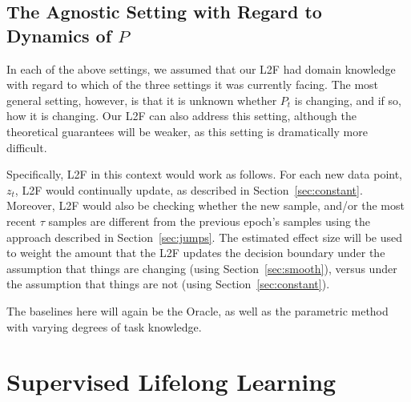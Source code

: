 \documentclass{article}
\begin{document}
\subsection{The Agnostic Setting with Regard to Dynamics of $P$}
\label{sec:combo}


In each of the above settings, we assumed that our L2F had domain knowledge with regard to which of the three settings it was currently facing.  The most general setting, however, is that it is unknown whether $P_t$ is changing, and if so, how it is changing.  Our L2F can also address this setting, although the theoretical guarantees will be weaker, as this setting is dramatically more difficult.  

Specifically, L2F in this context would work as follows.  For each new data point, $z_t$, L2F would continually update, as described in Section~\ref{sec:constant}.  Moreover, L2F would also be checking whether the new sample, and/or the most recent $\tau$ samples are different from the previous epoch's samples using the approach described in Section~\ref{sec:jumps}.  The estimated effect size will be used to weight the amount that the L2F updates the decision boundary under the assumption that things are changing (using Section~\ref{sec:smooth}), versus under the assumption that things are not (using Section~\ref{sec:constant}).  

The baselines here will again be the Oracle, as well as the parametric method with varying degrees of task knowledge. 

\clearpage
\section{Supervised Lifelong Learning}
\label{sec:transfer}
\end{document}
